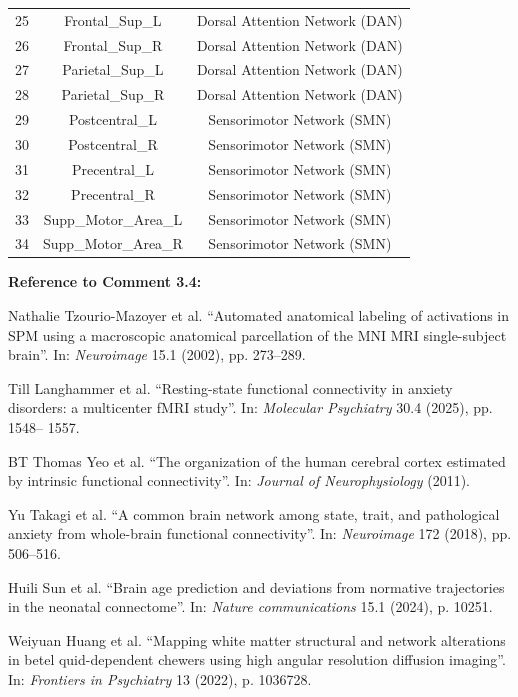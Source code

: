 \documentclass[12pt,technote,onecolumn]{IEEEtran}
\begin{document}
\begin{table}[htbp]
\begin{tabular}{ccc}
25 & Frontal\_Sup\_L       & Dorsal Attention Network (DAN) \\
26 & Frontal\_Sup\_R       & Dorsal Attention Network (DAN) \\
27 & Parietal\_Sup\_L      & Dorsal Attention Network (DAN) \\
28 & Parietal\_Sup\_R      & Dorsal Attention Network (DAN) \\
29 & Postcentral\_L        & Sensorimotor Network (SMN) \\
30 & Postcentral\_R        & Sensorimotor Network (SMN) \\
31 & Precentral\_L         & Sensorimotor Network (SMN) \\
32 & Precentral\_R         & Sensorimotor Network (SMN) \\
33 & Supp\_Motor\_Area\_L  & Sensorimotor Network (SMN) \\
34 & Supp\_Motor\_Area\_R  & Sensorimotor Network (SMN) \\
\bottomrule
\end{tabular}
\end{table}
\clearpage

\vspace{1mm}

\noindent \textbf{Reference to Comment 3.4:} 

\noindent[*1]\:Nathalie Tzourio-Mazoyer et al. ``Automated anatomical
labeling of activations in SPM using a macroscopic
anatomical parcellation of the MNI MRI single-subject
brain”. In: \textit{Neuroimage} 15.1 (2002), pp. 273–289.

\noindent[*2]\:Till Langhammer et al. ``Resting-state functional connectivity
in anxiety disorders: a multicenter fMRI
study”. In: \textit{Molecular Psychiatry} 30.4 (2025), pp. 1548–
1557.

\noindent[*3]\:BT Thomas Yeo et al. ``The organization of the human
cerebral cortex estimated by intrinsic functional connectivity”.
In: \textit{Journal of Neurophysiology} (2011).

\noindent[*4]\:Yu Takagi et al. ``A common brain network among
state, trait, and pathological anxiety from whole-brain
functional connectivity”. In: \textit{Neuroimage} 172 (2018),
pp. 506–516.

\noindent[*5]\:Huili Sun et al. ``Brain age prediction and deviations
from normative trajectories in the neonatal connectome”.
In: \textit{Nature communications} 15.1 (2024),
p. 10251.

\noindent[*6]\:Weiyuan Huang et al. ``Mapping white matter structural
and network alterations in betel quid-dependent chewers
using high angular resolution diffusion imaging”. In:
\textit{Frontiers in Psychiatry} 13 (2022), p. 1036728.
\end{document}
